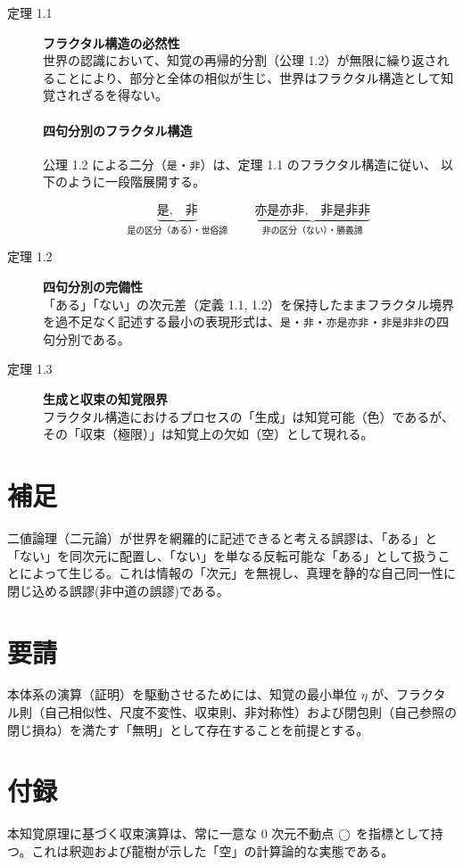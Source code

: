 \documentclass[11pt,a4paper]{ltjsarticle}
\begin{document}
\begin{description}
  \item[定理 1.1] \textbf{フラクタル構造の必然性}\\
  世界の認識において、知覚の再帰的分割（公理 1.2）が無限に繰り返されることにより、部分と全体の相似が生じ、世界はフラクタル構造として知覚されざるを得ない。

\paragraph{四句分別のフラクタル構造}
公理 1.2 による二分（\texttt{是}・\texttt{非}）は、定理 1.1 のフラクタル構造に従い、
以下のように一段階展開する。

\[
\underbrace{\text{是},\quad \text{非}}_{\text{是の区分（ある）・世俗諦}}
\qquad
\underbrace{\text{亦是亦非},\quad \text{非是非非}}_{\text{非の区分（ない）・勝義諦}}
\]
  
  \item[定理 1.2] \textbf{四句分別の完備性}\\
  「ある」「ない」の次元差（定義 1.1, 1.2）を保持したままフラクタル境界を過不足なく記述する最小の表現形式は、\texttt{是}・\texttt{非}・\texttt{亦是亦非}・\texttt{非是非非}の四句分別である。
  
  \item[定理 1.3] \textbf{生成と収束の知覚限界}\\
  フラクタル構造におけるプロセスの「生成」は知覚可能（色）であるが、その「収束（極限）」は知覚上の欠如（空）として現れる。
\end{description}

\section{補足}
二値論理（二元論）が世界を網羅的に記述できると考える誤謬は、「ある」と「ない」を同次元に配置し、「ない」を単なる反転可能な「ある」として扱うことによって生じる。これは情報の「次元」を無視し、真理を静的な自己同一性に閉じ込める誤謬(非中道の誤謬)である。

\section{要請}
本体系の演算（証明）を駆動させるためには、知覚の最小単位 $\eta$ が、フラクタル則（自己相似性、尺度不変性、収束則、非対称性）および閉包則（自己参照の閉じ損ね）を満たす「無明」として存在することを前提とする。

\section{付録}
本知覚原理に基づく収束演算は、常に一意な $0$ 次元不動点 $\bigcirc$ を指標として持つ。これは釈迦および龍樹が示した「空」の計算論的な実態である。
\end{document}
